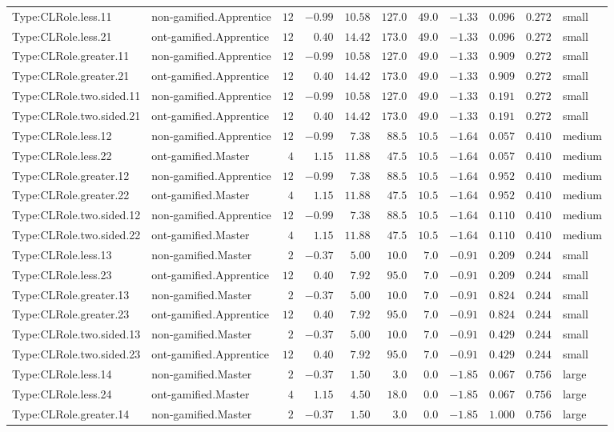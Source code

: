\documentclass[6pt,a4paper]{article}
\begin{document}
{\begin{longtable}{llrrrrrrrrl}
Type:CLRole.less.11&non-gamified.Apprentice&$12$&$-0.99$&$10.58$&$127.0$&$49.0$&$-1.33$&$0.096$&$0.272$&small\tabularnewline
Type:CLRole.less.21&ont-gamified.Apprentice&$12$&$ 0.40$&$14.42$&$173.0$&$49.0$&$-1.33$&$0.096$&$0.272$&small\tabularnewline
Type:CLRole.greater.11&non-gamified.Apprentice&$12$&$-0.99$&$10.58$&$127.0$&$49.0$&$-1.33$&$0.909$&$0.272$&small\tabularnewline
Type:CLRole.greater.21&ont-gamified.Apprentice&$12$&$ 0.40$&$14.42$&$173.0$&$49.0$&$-1.33$&$0.909$&$0.272$&small\tabularnewline
Type:CLRole.two.sided.11&non-gamified.Apprentice&$12$&$-0.99$&$10.58$&$127.0$&$49.0$&$-1.33$&$0.191$&$0.272$&small\tabularnewline
Type:CLRole.two.sided.21&ont-gamified.Apprentice&$12$&$ 0.40$&$14.42$&$173.0$&$49.0$&$-1.33$&$0.191$&$0.272$&small\tabularnewline
Type:CLRole.less.12&non-gamified.Apprentice&$12$&$-0.99$&$ 7.38$&$ 88.5$&$10.5$&$-1.64$&$0.057$&$0.410$&medium\tabularnewline
Type:CLRole.less.22&ont-gamified.Master&$ 4$&$ 1.15$&$11.88$&$ 47.5$&$10.5$&$-1.64$&$0.057$&$0.410$&medium\tabularnewline
Type:CLRole.greater.12&non-gamified.Apprentice&$12$&$-0.99$&$ 7.38$&$ 88.5$&$10.5$&$-1.64$&$0.952$&$0.410$&medium\tabularnewline
Type:CLRole.greater.22&ont-gamified.Master&$ 4$&$ 1.15$&$11.88$&$ 47.5$&$10.5$&$-1.64$&$0.952$&$0.410$&medium\tabularnewline
Type:CLRole.two.sided.12&non-gamified.Apprentice&$12$&$-0.99$&$ 7.38$&$ 88.5$&$10.5$&$-1.64$&$0.110$&$0.410$&medium\tabularnewline
Type:CLRole.two.sided.22&ont-gamified.Master&$ 4$&$ 1.15$&$11.88$&$ 47.5$&$10.5$&$-1.64$&$0.110$&$0.410$&medium\tabularnewline
Type:CLRole.less.13&non-gamified.Master&$ 2$&$-0.37$&$ 5.00$&$ 10.0$&$ 7.0$&$-0.91$&$0.209$&$0.244$&small\tabularnewline
Type:CLRole.less.23&ont-gamified.Apprentice&$12$&$ 0.40$&$ 7.92$&$ 95.0$&$ 7.0$&$-0.91$&$0.209$&$0.244$&small\tabularnewline
Type:CLRole.greater.13&non-gamified.Master&$ 2$&$-0.37$&$ 5.00$&$ 10.0$&$ 7.0$&$-0.91$&$0.824$&$0.244$&small\tabularnewline
Type:CLRole.greater.23&ont-gamified.Apprentice&$12$&$ 0.40$&$ 7.92$&$ 95.0$&$ 7.0$&$-0.91$&$0.824$&$0.244$&small\tabularnewline
Type:CLRole.two.sided.13&non-gamified.Master&$ 2$&$-0.37$&$ 5.00$&$ 10.0$&$ 7.0$&$-0.91$&$0.429$&$0.244$&small\tabularnewline
Type:CLRole.two.sided.23&ont-gamified.Apprentice&$12$&$ 0.40$&$ 7.92$&$ 95.0$&$ 7.0$&$-0.91$&$0.429$&$0.244$&small\tabularnewline
Type:CLRole.less.14&non-gamified.Master&$ 2$&$-0.37$&$ 1.50$&$  3.0$&$ 0.0$&$-1.85$&$0.067$&$0.756$&large\tabularnewline
Type:CLRole.less.24&ont-gamified.Master&$ 4$&$ 1.15$&$ 4.50$&$ 18.0$&$ 0.0$&$-1.85$&$0.067$&$0.756$&large\tabularnewline
Type:CLRole.greater.14&non-gamified.Master&$ 2$&$-0.37$&$ 1.50$&$  3.0$&$ 0.0$&$-1.85$&$1.000$&$0.756$&large\tabularnewline

\end{longtable}}
\end{document}
